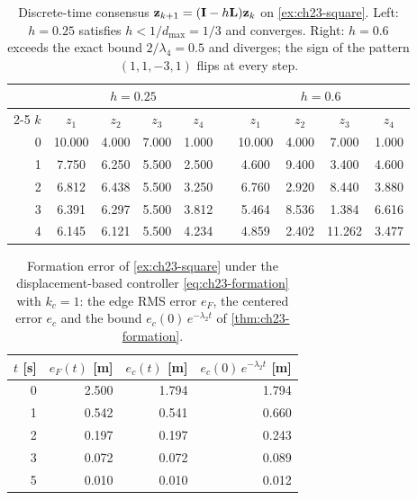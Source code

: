 \begin{table}[tb]
  \centering\small
  \caption{Discrete-time consensus $\mathbf{z}_{k+1} = (\mathbf{I} - h\mathbf{L})\mathbf{z}_k$
  on \cref{ex:ch23-square}. Left: $h = 0.25$ satisfies
  $h < 1/d_{\max} = 1/3$ and converges. Right: $h = 0.6$ exceeds the
  exact bound $2/\lambda_4 = 0.5$ and diverges; the sign of the pattern
  $(1, 1, -3, 1)$ flips at every step.}
  \label{tab:ch23-discrete}
  \begin{tabular}{@{}r cccc c cccc@{}}
  \toprule
  & \multicolumn{4}{c}{$h = 0.25$} & & \multicolumn{4}{c}{$h = 0.6$}\\
  \cmidrule{2-5}\cmidrule{7-10}
  $k$ & $z_1$ & $z_2$ & $z_3$ & $z_4$ & & $z_1$ & $z_2$ & $z_3$ & $z_4$\\
  \midrule
  0 & 10.000 & 4.000 & 7.000 & 1.000 & & 10.000 & 4.000 & 7.000 & 1.000\\
  1 & 7.750 & 6.250 & 5.500 & 2.500 & & 4.600 & 9.400 & 3.400 & 4.600\\
  2 & 6.812 & 6.438 & 5.500 & 3.250 & & 6.760 & 2.920 & 8.440 & 3.880\\
  3 & 6.391 & 6.297 & 5.500 & 3.812 & & 5.464 & 8.536 & 1.384 & 6.616\\
  4 & 6.145 & 6.121 & 5.500 & 4.234 & & 4.859 & 2.402 & 11.262 & 3.477\\
  \bottomrule
  \end{tabular}
\end{table}

\begin{table}[tb]
  \centering\small
  \caption{Formation error of \cref{ex:ch23-square} under the
  displacement-based controller \cref{eq:ch23-formation} with $k_c = 1$: the
  edge RMS error $e_F$, the centered error $e_c$ and the bound
  $e_c(0)\,e^{-\lambda_2 t}$ of \cref{thm:ch23-formation}.}
  \label{tab:ch23-formation}
  \begin{tabular}{@{}rrrr@{}}
  \toprule
  $t$ [s] & $e_F(t)$ [m] & $e_c(t)$ [m] & $e_c(0)\,e^{-\lambda_2 t}$ [m]\\
  \midrule
  0 & 2.500 & 1.794 & 1.794\\
  1 & 0.542 & 0.541 & 0.660\\
  2 & 0.197 & 0.197 & 0.243\\
  3 & 0.072 & 0.072 & 0.089\\
  5 & 0.010 & 0.010 & 0.012\\
  \bottomrule
  \end{tabular}
\end{table}

